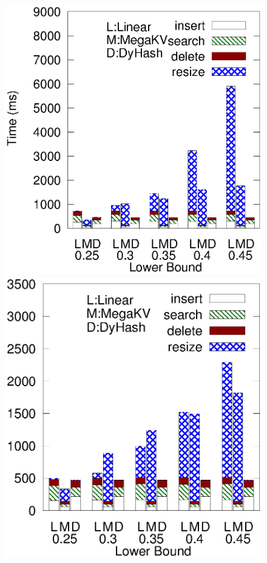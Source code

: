 \begin{figure}[htp]
	\begin{minipage}{0.19\linewidth}\centering
		\includegraphics[width=\linewidth]{pic/dynamic/twitter/diff_lower.eps}
		\centerline{\dstwitter}
	\end{minipage}
	\begin{minipage}{0.19\linewidth}\centering
		\includegraphics[width=\linewidth]{pic/dynamic/reddit/diff_lower.eps}

\end{minipage}
\end{figure}
